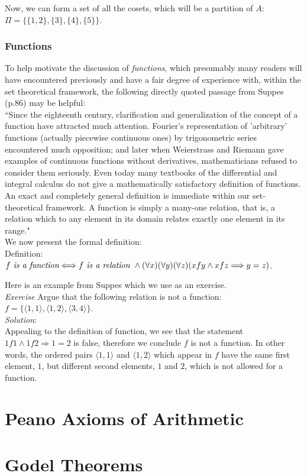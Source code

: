 Now, we can form a set of all the cosets, which will be a partition of $A$:\\
$\Pi=\{\{1,2\},\{3\},\{4\},\{5\}\}$.

\subsubsection{Functions}

To help motivate the discussion of \textit{functions}, which presumably many readers will have encountered previously and have a fair degree of experience with, within the set theoretical framework, the following directly quoted passage from Suppes (p.86) may be helpful:\\

``Since the eighteenth century, clarification and generalization of the concept of a function have attracted much attention.  Fourier's representation of 'arbitrary' functions (actually piecewise continuous ones) by trigonometric series encountered much opposition; and later when Weierstrass and Riemann gave examples of continuous functions without derivatives, mathematicians refused to consider them seriously.  Even today many textbooks of the differential and integral calculus do not give a mathematically satisfactory definition of functions.  An exact and completely general definition is immediate within our set-theoretical framework.  A function is simply a many-one relation, that is, a relation which to any element in its domain relates exactly one element in its range."\\

We now present the formal definition:\\

Definition: $f \textit{ is a function}\index{function} \Longleftrightarrow f \textit{ is a relation } \land (\forall x)(\forall y)(\forall z)(x f y \land x f z \Longrightarrow y = z)$.

Here is an example from Suppes which we use as an exercise.\\

\textit{Exercise} Argue that the following relation is not a function: $f=\{\langle 1,1\rangle, \langle 1,2 \rangle, \langle 3,4 \rangle\}$.\\

\textit{Solution}:\\
Appealing to the definition of function, we see that the statement $1f1 \land 1f2 \Longrightarrow 1=2$ is false, therefore we conclude $f$ is not a function.  In other words, the ordered pairs $\langle 1, 1 \rangle$ and $\langle 1, 2\rangle$ which appear in $f$ have the same first element, $1$, but different second elements, $1$ and $2$, which is not allowed for a function.



\section{Peano Axioms of Arithmetic}

\section{Godel Theorems}